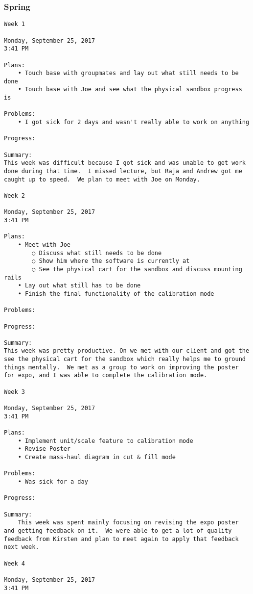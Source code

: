 \subsubsection{Spring}
\begin{lstlisting}
Week 1

Monday, September 25, 2017
3:41 PM

Plans:
	• Touch base with groupmates and lay out what still needs to be done
	• Touch base with Joe and see what the physical sandbox progress is

Problems:
	• I got sick for 2 days and wasn't really able to work on anything

Progress:

Summary:
This week was difficult because I got sick and was unable to get work done during that time.  I missed lecture, but Raja and Andrew got me caught up to speed.  We plan to meet with Joe on Monday.

Week 2

Monday, September 25, 2017
3:41 PM

Plans:
	• Meet with Joe
		○ Discuss what still needs to be done
		○ Show him where the software is currently at
		○ See the physical cart for the sandbox and discuss mounting rails
	• Lay out what still has to be done
	• Finish the final functionality of the calibration mode

Problems:

Progress:

Summary:
This week was pretty productive. On we met with our client and got the see the physical cart for the sandbox which really helps me to ground things mentally.  We met as a group to work on improving the poster for expo, and I was able to complete the calibration mode.

Week 3

Monday, September 25, 2017
3:41 PM

Plans:
	• Implement unit/scale feature to calibration mode
	• Revise Poster
	• Create mass-haul diagram in cut & fill mode

Problems:
	• Was sick for a day

Progress:

Summary:
	This week was spent mainly focusing on revising the expo poster and getting feedback on it.  We were able to get a lot of quality feedback from Kirsten and plan to meet again to apply that feedback next week.

Week 4

Monday, September 25, 2017
3:41 PM


\end{lstlisting}
